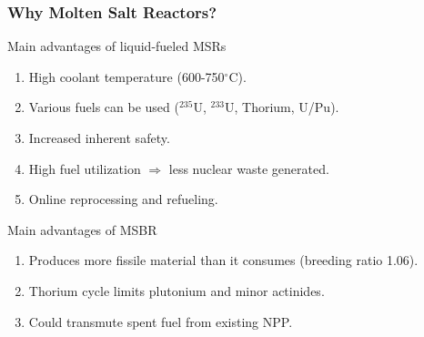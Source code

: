 \begin{frame}
  \frametitle{Why Molten Salt Reactors?}
                  \vspace*{-0.1in}
              \begin{block}{Main advantages of liquid-fueled \glspl{MSR} \cite{elsheikh_safety_2013}}
               \begin{enumerate}
                \item High coolant temperature (600-750$^{\circ}$C).
                \item Various fuels can be used ($^{235}$U, $^{233}$U, Thorium, U/Pu).
                \item Increased inherent safety.
                \item High fuel utilization $\Rightarrow$ less nuclear waste generated.
                \item Online reprocessing and refueling.
               \end{enumerate}
               \end{block}
                  \vspace*{-0.1in}               
               \begin{block}{Main advantages of \gls{MSBR} \cite{robertson_conceptual_1971}}
               \begin{enumerate}
                \item Produces more fissile material than it consumes (breeding ratio 1.06).
                \item Thorium cycle limits plutonium and minor actinides.
                \item Could transmute spent fuel from existing \gls{NPP}.
               \end{enumerate}
               \end{block}

\end{frame}


